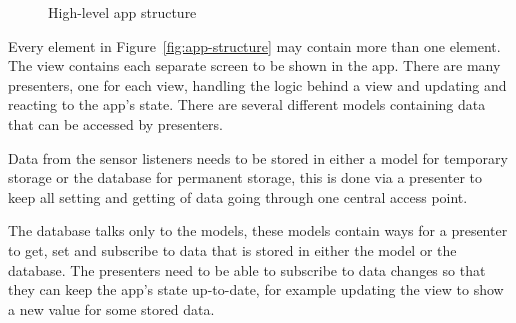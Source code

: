\begin{figure}[ht]
  \centering
  \begin{scaletikzpicturetowidth}{\linewidth}
  \end{scaletikzpicturetowidth}
  \caption{High-level app structure}\label{fig:app-structure}
\end{figure}

Every element in Figure~\vref{fig:app-structure} may contain more than one element. The view contains each separate screen to be shown in the app. There are many presenters, one for each view, handling the logic behind a view and updating and reacting to the app's state. There are several different models containing data that can be accessed by presenters.

Data from the sensor listeners needs to be stored in either a model for temporary storage or the database for permanent storage, this is done via a presenter to keep all setting and getting of data going through one central access point.

The database talks only to the models, these models contain ways for a presenter to get, set and subscribe to data that is stored in either the model or the database. The presenters need to be able to subscribe to data changes so that they can keep the app's state up-to-date, for example updating the view to show a new value for some stored data.

